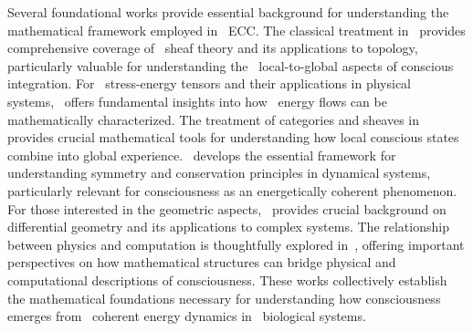 Several foundational works provide essential background for understanding the~ mathematical framework employed in~ ECC. The classical treatment in~\cite{bredon1997sheaf} provides comprehensive coverage of~ sheaf theory and its applications to topology, particularly valuable for understanding the~ local-to-global aspects of conscious integration. For~ stress-energy tensors and their applications in physical systems,~\cite{misner2017gravitation} offers fundamental insights into how~ energy flows can be mathematically characterized. The treatment of categories and sheaves in~\cite{kashiwara2006categories} provides crucial mathematical tools for understanding how local conscious states combine into global experience.~\cite{marsden2013introduction} develops the essential framework for understanding symmetry and conservation principles in dynamical systems, particularly relevant for consciousness as an energetically coherent phenomenon. For those interested in the geometric aspects,~\cite{wells2008differential} provides crucial background on differential geometry and its applications to complex systems. The relationship between physics and computation is thoughtfully explored in~\cite{baez2011physics}, offering important perspectives on how mathematical structures can bridge physical and computational descriptions of consciousness. These works collectively establish the mathematical foundations necessary for understanding how consciousness emerges from~ coherent energy dynamics in~ biological systems.
